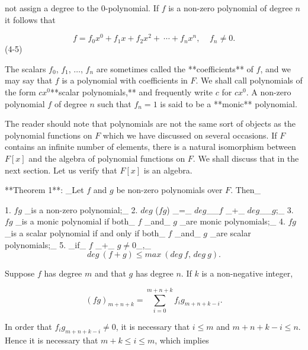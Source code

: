 not assign a degree to the 0-polynomial. If \(f\) is a non-zero polynomial of degree \(n\) it follows that

\[f=f_{0}x^{0}+f_{1}x+f_{2}x^{2}+\ \cdots+f_{n}x^{n},\ \ \ \ \ f_{n}\neq 0.\] (4-5)

The scalars \(f_{0}\), \(f_{1}\), \(\ldots\), \(f_{n}\) are sometimes called the **coefficients** of \(f\), and we may say that \(f\) is a polynomial with coefficients in \(F\). We shall call polynomials of the form \(cx^{0}\)**scalar polynomials,** and frequently write \(c\) for \(cx^{0}\). A non-zero polynomial \(f\) of degree \(n\) such that \(f_{n}=1\) is said to be a **monic** polynomial.

The reader should note that polynomials are not the same sort of objects as the polynomial functions on \(F\) which we have discussed on several occasions. If \(F\) contains an infinite number of elements, there is a natural isomorphism between \(F[x]\) and the algebra of polynomial functions on \(F\). We shall discuss that in the next section. Let us verify that \(F[x]\) is an algebra.

**Theorem 1**: _Let \(f\) and \(g\) be non-zero polynomials over \(F\). Then_

1. \(fg\) _is a non-zero polynomial;_
2. \(deg\) (\(fg\)) _=_ \(deg\)__\(f\) _+_ \(deg\)__\(g\);_
3. \(fg\) _is a monic polynomial if both_ \(f\) _and_ \(g\) _are monic polynomials;_
4. \(fg\) _is a scalar polynomial if and only if both_ \(f\) _and_ \(g\) _are scalar polynomials;_
5. _if_ \(f\) _+_ \(g\neq 0\)_,_ \[deg\ (f+g)\leq max\ (deg\ f,\,deg\ g).\]

Suppose \(f\) has degree \(m\) and that \(g\) has degree \(n\). If \(k\) is a non-negative integer,

\[(fg)_{m+n+k}=\sum\limits_{i=0}^{m+n+k}f_{i}g_{m+n+k-i}.\]

In order that \(f_{i}g_{m+n+k-i}\neq 0\), it is necessary that \(i\leq m\) and \(m+n+k-i\leq n\). Hence it is necessary that \(m+k\leq i\leq m\), which implies 